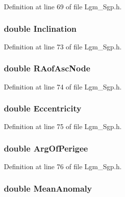Definition at line 69 of file Lgm\_\-Sgp.h.\hypertarget{struct___sgp_t_l_e_dc4143d3dcc5a8a32498a8d172e0d394}{
\subsubsection[{Inclination}]{\setlength{\rightskip}{0pt plus 5cm}double {\bf Inclination}}}
\label{struct___sgp_t_l_e_dc4143d3dcc5a8a32498a8d172e0d394}




Definition at line 73 of file Lgm\_\-Sgp.h.\hypertarget{struct___sgp_t_l_e_32a0bdaab6be58e1e601ee6c236c681e}{
\subsubsection[{RAofAscNode}]{\setlength{\rightskip}{0pt plus 5cm}double {\bf RAofAscNode}}}
\label{struct___sgp_t_l_e_32a0bdaab6be58e1e601ee6c236c681e}




Definition at line 74 of file Lgm\_\-Sgp.h.\hypertarget{struct___sgp_t_l_e_9e8627236231ee5feff425a382c3cc0d}{
\subsubsection[{Eccentricity}]{\setlength{\rightskip}{0pt plus 5cm}double {\bf Eccentricity}}}
\label{struct___sgp_t_l_e_9e8627236231ee5feff425a382c3cc0d}




Definition at line 75 of file Lgm\_\-Sgp.h.\hypertarget{struct___sgp_t_l_e_faafa77786dcba9c30db49ee397f3bdc}{
\subsubsection[{ArgOfPerigee}]{\setlength{\rightskip}{0pt plus 5cm}double {\bf ArgOfPerigee}}}
\label{struct___sgp_t_l_e_faafa77786dcba9c30db49ee397f3bdc}




Definition at line 76 of file Lgm\_\-Sgp.h.\hypertarget{struct___sgp_t_l_e_d3d6acdadbbc8715b238f8f6fbf4d4a8}{
\subsubsection[{MeanAnomaly}]{\setlength{\rightskip}{0pt plus 5cm}double {\bf MeanAnomaly}}}
\label{struct___sgp_t_l_e_d3d6acdadbbc8715b238f8f6fbf4d4a8}




